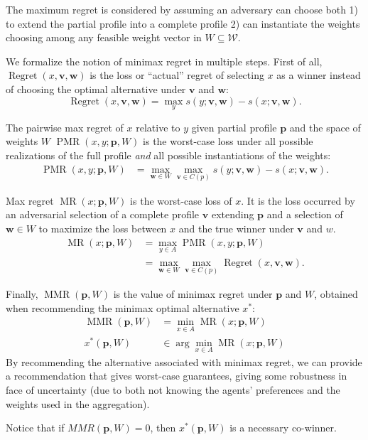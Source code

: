 \documentclass[12pt]{article}
\newcommand{\profile}{\textbf{v}}%
\newcommand{\pprofile}{\textbf{p}}%
\newcommand{\w}{\textbf{w}}%
\DeclareMathOperator{\Regret}{Regret}
\DeclareMathOperator{\PMR}{PMR}
\DeclareMathOperator{\MR}{MR}
\DeclareMathOperator{\MMR}{MMR}
\begin{document}
The maximum regret is considered by assuming an adversary can choose both 1) to extend the partial profile into a complete profile 2) can instantiate the weights choosing among any feasible weight vector in $W \subseteq \mathcal{W}$.

We formalize the notion of minimax regret in multiple steps.
First of all, $\Regret(x, \profile, \w)$ is the loss or ``actual'' regret  of selecting $x$ as a winner instead of choosing the optimal alternative under $\profile$ and $\w$:
\[\Regret(x, \profile, \w) = \max_{y} s(y; \profile,\w) - s(x; \profile, \w).\]

The pairwise max regret of $x$ relative to $y$ given partial profile $\pprofile$ and the space of weights $W$
$\PMR(x,y;\pprofile,W)$ is the worst-case loss under all possible realizations of the full profile {\em and} all possible instantiations of the weights:
\begin{align}
\PMR(x,y; \pprofile, W) & = \max_{\w \in W} \max_{\profile \in C(p)} s(y; \profile,\w) - s(x; \profile,\w).
\end{align}

Max regret $\MR(x;\pprofile,W)$ is the worst-case loss of $x$. It is the loss occurred by an adversarial selection of a complete profile $\profile$ extending $\pprofile$ and a selection of $\w \in W$ to maximize the loss between $x$ and the true winner under $\profile$ and $w$.
\begin{align}
\MR(x; \pprofile, W) & = \max_{y \in A} \PMR(x,y; \pprofile, W)\\
& = \max_{\w \in W} \max_{\profile \in C(p)} \Regret(x, \profile, \w).
\end{align}

Finally,  $\MMR(\pprofile,W)$ is the value of minimax regret under $\pprofile$ and $W$, obtained when recommending the minimax optimal alternative $x^*$:
\begin{align*}
\MMR(\pprofile,W) & = \min_{x \in A} \MR(x;\pprofile,W) \\
x^{*}(\pprofile,W) & \in \arg\min_{x \in A} \MR(x;\pprofile,W) 
\end{align*}
By recommending the alternative associated with minimax regret, we can provide a recommendation that gives worst-case guarantees, giving some robustness in face of uncertainty (due to both not knowing the agents' preferences and the weights used in the aggregation). 

Notice that if $MMR(\pprofile, W)=0$, then $x^{*}(\pprofile,W)$  is a necessary co-winner.
\end{document}
